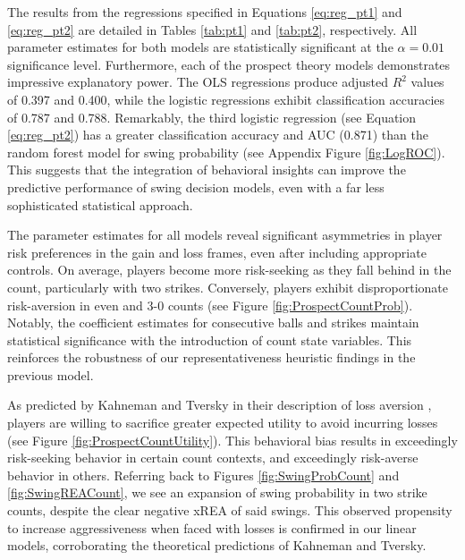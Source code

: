 \documentclass[12pt]{article}
\numberwithin{equation}{section}
\begin{document}
The results from the regressions specified in Equations \ref{eq:reg_pt1} and \ref{eq:reg_pt2} are detailed in Tables \ref{tab:pt1} and \ref{tab:pt2}, respectively. All parameter estimates for both models are statistically significant at the $\alpha = 0.01$ significance level. Furthermore, each of the prospect theory models demonstrates impressive explanatory power. The OLS regressions produce adjusted $R^2$ values of 0.397 and 0.400, while the logistic regressions exhibit classification accuracies of 0.787 and 0.788. Remarkably, the third logistic regression (see Equation \ref{eq:reg_pt2}) has a greater classification accuracy and AUC (0.871) than the random forest model for swing probability (see Appendix Figure \ref{fig:LogROC}). This suggests that the integration of behavioral insights can improve the predictive performance of swing decision models, even with a far less sophisticated statistical approach.

\vspace{5mm} %

The parameter estimates for all models reveal significant asymmetries in player risk preferences in the gain and loss frames, even after including appropriate controls. On average, players become more risk-seeking as they fall behind in the count, particularly with two strikes. Conversely, players exhibit disproportionate risk-aversion in even and 3-0 counts (see Figure \ref{fig:ProspectCountProb}). Notably, the coefficient estimates for consecutive balls and strikes maintain statistical significance with the introduction of count state variables. This reinforces the robustness of our representativeness heuristic findings in the previous model.

\vspace{5mm} %

As predicted by Kahneman and Tversky in their description of loss aversion \parencite{kahneman_prospect_1979}, players are willing to sacrifice greater expected utility to avoid incurring losses (see Figure \ref{fig:ProspectCountUtility}). This behavioral bias results in exceedingly risk-seeking behavior in certain count contexts, and exceedingly risk-averse behavior in others. Referring back to Figures \ref{fig:SwingProbCount} and \ref{fig:SwingREACount}, we see an expansion of swing probability in two strike counts, despite the clear negative xREA of said swings. This observed propensity to increase aggressiveness when faced with losses is confirmed in our linear models, corroborating the theoretical predictions of Kahneman and Tversky.
\end{document}

